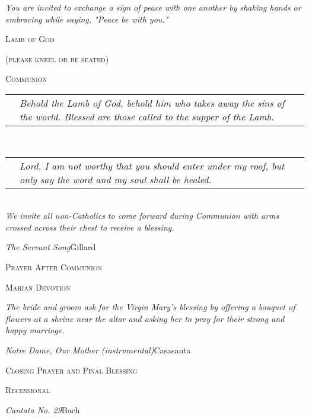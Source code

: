 \documentclass[twoside]{article}
\makeatletter
\newcommand{\masssubpart}[1]{\bigskip

  {\large\scshape #1}}
\newcommand{\note}[1]{{\centering \textit{#1}}}
\newcommand{\sayline}[2]{
  \begin{tabularx}{\textwidth}{@{} r X @{}}
    \makebox[6.0em][r]{\textit{#1:}} & \textit{#2}
\end{tabularx}\\}
\newcommand{\songlisting}[2]{\textit{#1}\hdashrule{\fill}{1pt}{1pt}#2\\}
\newcommand{\inputmusic}[1]{\parbox{\textwidth}{}}
\makeatother
\begin{document}
\note{You are invited to exchange a sign of peace with one another by shaking hands or embracing while saying, "Peace be with you."}

\masssubpart{Lamb of God}

\inputmusic{sample}

\masssubpart{(please kneel or be seated)}

\masssubpart{Communion}

\sayline{Priest}{Behold the Lamb of God, behold him who takes away the sins of the world. Blessed are those called to the supper of the Lamb.}
\sayline{All}{Lord, I am not worthy that you should enter under my roof, but only say the word and my soul shall be healed.}

\note{We invite all non-Catholics to come forward during Communion with arms crossed across their chest to receive a blessing.}

\newpage
\songlisting{The Servant Song}{Gillard}

\inputmusic{sample}

\masssubpart{Prayer After Communion}

\masssubpart{Marian Devotion}

\note{The bride and groom ask for the Virgin Mary's blessing by offering a bouquet of flowers at a shrine near the altar and asking her to pray for their strong and happy marriage.}

\songlisting{Notre Dame, Our Mother (instrumental)}{Casasanta}

\vspace{-1.5em}
\masssubpart{Closing Prayer and Final Blessing}

\masssubpart{Recessional}

\songlisting{Cantata No. 29}{Bach}

\newpage
\end{document}
